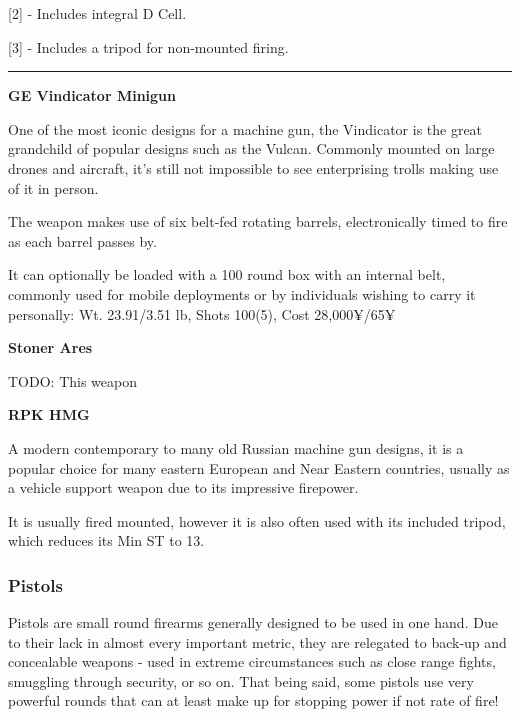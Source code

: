 [2] - Includes integral D Cell.

[3] - Includes a tripod for non-mounted firing.

\par\rule{\textwidth}{0.5pt} 


\begin{mdframed}[linewidth=0pt]
	\begin{multicols}{2}
		
	\textbf{GE Vindicator Minigun}
	
	One of the most iconic designs for a machine gun, the Vindicator is the great grandchild of popular designs such as the Vulcan. Commonly mounted on large drones and aircraft, it's still not impossible to see enterprising trolls making use of it in person.
	
	The weapon makes use of six belt-fed rotating barrels, electronically timed to fire as each barrel passes by. 
	
	It can optionally be loaded with a 100 round box with an internal belt, commonly used for mobile deployments or by individuals wishing to carry it personally: Wt. 23.91/3.51 lb, Shots 100(5), Cost 28,000¥/65¥
	
	
	\textbf{Stoner Ares}
	
	TODO: This weapon
	
	\textbf{RPK HMG}
	
	A modern contemporary to many old Russian machine gun designs, it is a popular choice for many eastern European and Near Eastern countries, usually as a vehicle support weapon due to its impressive firepower.
	
	It is usually fired mounted, however it is also often used with its included tripod, which reduces its Min ST to 13.
	
\end{multicols}
\end{mdframed}

\subsubsection{Pistols}

Pistols are small round firearms generally designed to be used in one hand. Due to their lack in almost every important metric, they are relegated to back-up and concealable weapons - used in extreme circumstances such as close range fights, smuggling through security, or so on. That being said, some pistols use very powerful rounds that can at least make up for stopping power if not rate of fire!

